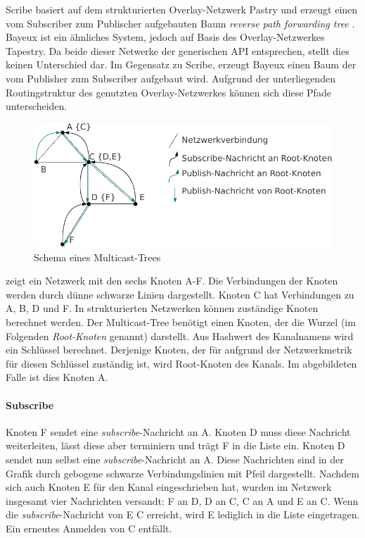 Scribe basiert auf dem strukturierten Overlay-Netzwerk Pastry \cite{Rowstron2001} und erzeugt einen vom Subscriber zum Publischer aufgebauten Baum \emph{reverse path forwarding tree} \cite{Dalal1978}.\\
Bayeux \cite{Zhuang2001} ist ein ähnliches System, jedoch auf Basis des Overlay-Netzwerkes Tapestry. Da beide dieser Netwerke der generischen API entsprechen, stellt dies keinen Unterschied dar. Im Gegensatz zu Scribe, erzeugt Bayeux einen Baum der vom Publisher zum Subscriber aufgebaut wird. Aufgrund der unterliegenden Routingstruktur des genutzten Overlay-Netzwerkes können sich diese Pfade unterscheiden.

\begin{figure}[htbp]
\centering
\includegraphics{grafics/multicast_tree.pdf}
\caption{Schema eines Multicast-Trees}
\label{fig:multicast_tree}
\end{figure}

 zeigt ein Netzwerk mit den sechs Knoten A-F. Die Verbindungen der Knoten werden durch dünne schwarze Linien dargestellt. Knoten C hat Verbindungen zu A, B, D und F. In strukturierten Netzwerken können zuständige Knoten berechnet werden. Der Multicast-Tree benötigt einen Knoten, der die Wurzel (im Folgenden \emph{Root-Knoten} genannt) darstellt. Aus Hashwert des Kanalnamens wird ein Schlüssel berechnet. Derjenige Knoten, der für aufgrund der Netzwerkmetrik für diesen Schlüssel zuständig ist, wird Root-Knoten des Kanals. Im abgebildeten Falle ist dies Knoten A.

\paragraph*{Subscribe}
Knoten F sendet eine \emph{subscribe}-Nachricht an A. Knoten D muss diese Nachricht weiterleiten, lässt diese aber terminiern und trägt F in die Liste ein. Knoten D sendet nun selbst eine \emph{subscribe}-Nachricht an A. Diese Nachrichten sind in der Grafik durch gebogene schwarze Verbindungslinien mit Pfeil dargestellt. Nachdem sich auch Knoten E für den Kanal eingeschrieben hat, wurden im Netzwerk insgesamt vier Nachrichten versandt: F an D, D an C, C an A und E an C. Wenn die \emph{subscribe}-Nachricht von E C erreicht, wird E lediglich in die Liste eingetragen. Ein erneutes Anmelden von C entfällt.

